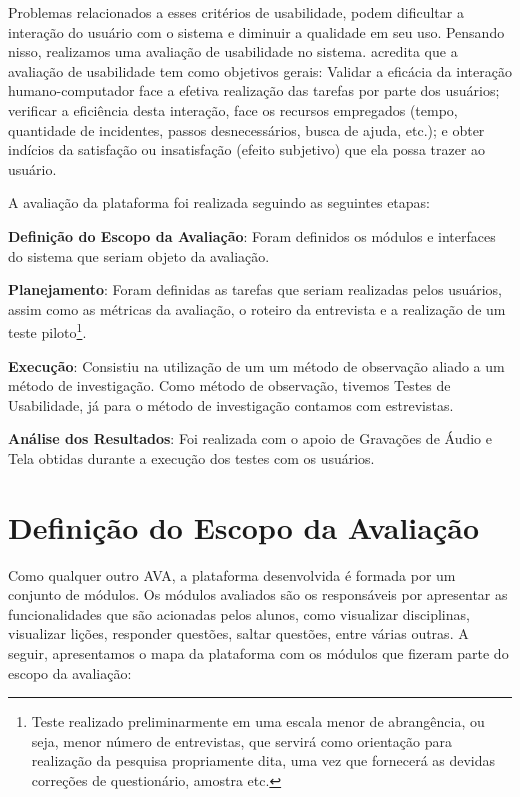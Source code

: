 Problemas relacionados a esses crit\'erios de usabilidade, podem dificultar a intera\c{c}\~ao do usu\'ario com o sistema e diminuir a 
qualidade em seu uso. Pensando nisso, realizamos uma avalia\c{c}\~ao de usabilidade no sistema.  acredita que a avalia\c{c}\~ao de usabilidade tem como objetivos gerais: Validar a eficácia da interação humano-computador face a efetiva realização das tarefas por parte dos usuários; verificar a eficiência desta interação, face os recursos empregados (tempo, quantidade de incidentes, passos desnecessários, 
busca de ajuda, etc.); e obter indícios da satisfação ou insatisfação (efeito subjetivo) que ela possa trazer ao usuário.

A avaliação da plataforma foi realizada seguindo as seguintes etapas:

\begin{alineascomnumero}
	\item \textbf{Definição do Escopo da Avaliação}: Foram definidos os módulos e interfaces do sistema que seriam objeto da avaliação.
	\item \textbf{Planejamento}: Foram definidas as tarefas que seriam realizadas pelos usuários, assim como as métricas da avaliação, o roteiro da entrevista e a realização de um teste piloto\footnote{Teste realizado preliminarmente em uma escala menor de abrangência, ou seja, menor número de entrevistas, que servirá como orientação para realização da pesquisa propriamente dita, uma vez que fornecerá as devidas correções de questionário, amostra etc.}. 
	\item \textbf{Execução}: Consistiu na utilização de um um método de observação aliado a um método de investigação. Como método de observação, tivemos Testes de Usabilidade, já para o método de investigação contamos com estrevistas.
	\item \textbf{An\'alise dos Resultados}: Foi realizada com o apoio de Gravações de Áudio e Tela obtidas durante a execução dos testes com os usuários.
\end{alineascomnumero}

\section{Definição do Escopo da Avalia\c{c}\~ao}
Como qualquer outro AVA, a plataforma desenvolvida é formada por um conjunto de módulos. Os módulos avaliados são os responsáveis por apresentar as funcionalidades que são acionadas pelos alunos, como visualizar disciplinas, visualizar lições, responder questões, saltar questões, entre várias outras. A seguir, apresentamos o mapa da plataforma com os módulos que fizeram parte do escopo da avaliação:

